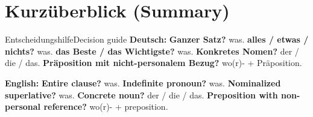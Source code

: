 \documentclass[a4paper,11pt]{article}
\newcommand{\GermanText}[1]{\textbf{Deutsch: }#1\par}
\newcommand{\EnglishText}[1]{{\small\color{SoftGray}\textbf{English: }#1\par}}
\begin{document}
   \section{Kurzüberblick (Summary)}
                                       \begin{grammarentry}{Entscheidungshilfe}{Decision guide}
                                          \GermanText{\textbf{Ganzer Satz?} was. \textbf{alles / etwas / nichts?} was. \textbf{das Beste / das Wichtigste?} was. \textbf{Konkretes Nomen?} der / die / das. \textbf{Präposition mit nicht-personalem Bezug?} wo(r)- + Präposition.}
                                          \EnglishText{\textbf{Entire clause?} was. \textbf{Indefinite pronoun?} was. \textbf{Nominalized superlative?} was. \textbf{Concrete noun?} der / die / das. \textbf{Preposition with non-personal reference?} wo(r)- + preposition.}
                                       \end{grammarentry}
\end{document}
